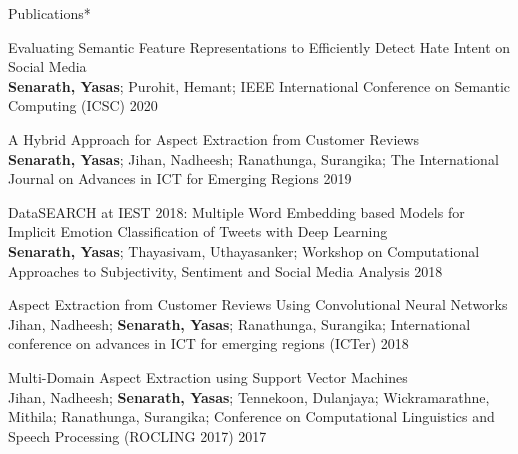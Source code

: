 \documentclass{resume} %
\begin{document}
\begin{rSection}{Publications*}
    \begin{rSubsection}{ Evaluating Semantic Feature Representations to Efficiently Detect Hate Intent on Social Media }{\\ \textbf{Senarath, Yasas}; Purohit, Hemant; }{IEEE International Conference on Semantic Computing (ICSC)}{ 2020 }
    \end{rSubsection}


    \begin{rSubsection}{ A Hybrid Approach for Aspect Extraction from Customer Reviews }{\\ \textbf{Senarath, Yasas}; Jihan, Nadheesh; Ranathunga, Surangika; }{The International Journal on Advances in ICT for Emerging Regions}{ 2019 }
    \end{rSubsection}


    \begin{rSubsection}{ DataSEARCH at IEST 2018: Multiple Word Embedding based Models for Implicit Emotion Classification of Tweets with Deep Learning }{\\ \textbf{Senarath, Yasas}; Thayasivam, Uthayasanker; }{Workshop on Computational Approaches to Subjectivity, Sentiment and Social Media Analysis}{ 2018 }
    \end{rSubsection}

    \begin{rSubsection}{ Aspect Extraction from Customer Reviews Using Convolutional Neural Networks }{\\ Jihan, Nadheesh; \textbf{Senarath, Yasas}; Ranathunga, Surangika; }{International conference on advances in ICT for emerging regions (ICTer)}{ 2018 }
    \end{rSubsection}

    \begin{rSubsection}{ Multi-Domain Aspect Extraction using Support Vector Machines }{\\ Jihan, Nadheesh; \textbf{Senarath, Yasas}; Tennekoon, Dulanjaya; Wickramarathne, Mithila; Ranathunga, Surangika; }{Conference on Computational Linguistics and Speech Processing (ROCLING 2017)}{ 2017 }
    \end{rSubsection}

\end{rSection}
\end{document}
